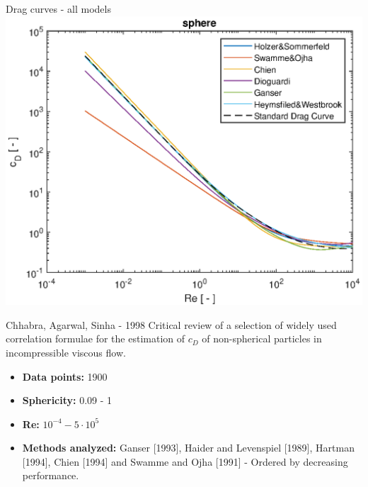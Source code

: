\documentclass[11pt]{beamer}
\begin{document}
	\begin{frame}{Drag curves - all models}
		\centering
		\includegraphics[height=\textheight,width=\textwidth,keepaspectratio] {sphere_cD_all.eps}		
	\end{frame}

	\begin{frame}{Chhabra, Agarwal, Sinha - 1998}
		Critical review of a selection of widely used correlation formulae for the estimation of $ c_D $ of non-spherical particles in incompressible viscous flow.
		\begin{itemize}
			\item \textbf{Data points:} 1900
			\item \textbf{Sphericity:} 0.09 - 1
			\item \textbf{Re:} $ 10^{-4} - 5 \cdot 10^5 $
			\item \textbf{Methods analyzed:} Ganser [1993], Haider and Levenspiel [1989], Hartman [1994], Chien [1994] and Swamme and Ojha [1991] - Ordered by decreasing performance.
		\end{itemize}
	\end{frame}
\end{document}
